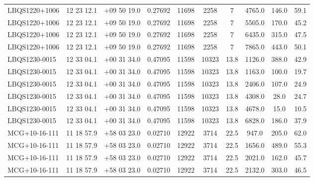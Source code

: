 \begin{landscape}
\begin{center}
\begin{longtable}{l c c c c c c c c c}
LBQS1220+1006  &           12 23 12.1  &         $+$09 50 19.0  &       0.27692  & 11698  &   2258  &       7  &         4765.0  &  146.0  &  59.1  \\
LBQS1220+1006  &           12 23 12.1  &         $+$09 50 19.0  &       0.27692  & 11698  &   2258  &       7  &         5505.0  &  170.0  &  45.2  \\
LBQS1220+1006  &           12 23 12.1  &         $+$09 50 19.0  &       0.27692  & 11698  &   2258  &       7  &         6435.0  &  315.0  &  47.5  \\
LBQS1220+1006  &           12 23 12.1  &         $+$09 50 19.0  &       0.27692  & 11698  &   2258  &       7  &         7865.0  &  443.0  &  50.1  \\
LBQS1230-0015  &           12 33 04.1  &         $+$00 31 34.0  &       0.47095  & 11598  &   10323  &      13.8  &      1126.0  &  388.0  &  42.9  \\
LBQS1230-0015  &           12 33 04.1  &         $+$00 31 34.0  &       0.47095  & 11598  &   10323  &      13.8  &      1163.0  &  100.0  &  19.7  \\
LBQS1230-0015  &           12 33 04.1  &         $+$00 31 34.0  &       0.47095  & 11598  &   10323  &      13.8  &      2406.0  &  107.0  &  24.9  \\
LBQS1230-0015  &           12 33 04.1  &         $+$00 31 34.0  &       0.47095  & 11598  &   10323  &      13.8  &      4308.0  &  28.0  &   24.7  \\
LBQS1230-0015  &           12 33 04.1  &         $+$00 31 34.0  &       0.47095  & 11598  &   10323  &      13.8  &      4678.0  &  15.0  &   10.5  \\
LBQS1230-0015  &           12 33 04.1  &         $+$00 31 34.0  &       0.47095  & 11598  &   10323  &      13.8  &      6828.0  &  186.0  &  37.9  \\
MCG+10-16-111  &           11 18 57.9  &         $+$58 03 23.0  &       0.02710  & 12922  &   3714  &       22.5  &      947.0  &   205.0  &  62.0  \\
MCG+10-16-111  &           11 18 57.9  &         $+$58 03 23.0  &       0.02710  & 12922  &   3714  &       22.5  &      1656.0  &  489.0  &  55.3  \\
MCG+10-16-111  &           11 18 57.9  &         $+$58 03 23.0  &       0.02710  & 12922  &   3714  &       22.5  &      2021.0  &  162.0  &  45.7  \\
MCG+10-16-111  &           11 18 57.9  &         $+$58 03 23.0  &       0.02710  & 12922  &   3714  &       22.5  &      2132.0  &  303.0  &  46.5  \\

\end{longtable}
\end{center}
\end{landscape}
